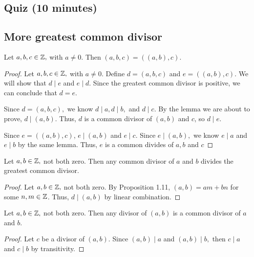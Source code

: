 \documentclass{ximera}
\begin{document}
\subsection{Quiz (10 minutes)}
\subsection{More greatest common divisor} 

\begin{lem}\label{gcd_3case}
	Let $a,b,c\in\mathbb Z,$ with $a\neq 0$. Then $(a,b,c)=((a,b),c).$
\end{lem}

 \begin{proof}
 	Let $a,b,c\in\mathbb Z,$ with $a\neq 0$. Define $d=(a,b,c)$ and $e=((a,b),c).$ We will show that $d\mid e$ and $e\mid d$. Since the greatest common divisor is positive, we can conclude that $d=e$.

 	Since $d=(a,b,c),$ we know $d\mid a, d\mid b,$ and $d\mid c$. By the lemma we are about to prove, $d\mid (a,b)$. Thus, $d$ is a common divisor of $(a,b)$ and $c$, so $d\mid e$.

 	Since $e=((a,b),c)$, $e\mid  (a,b)$ and $e\mid c$. Since $e\mid (a,b),$ we know $e\mid a$ and $e\mid b$ by the same lemma. Thus, $e$ is a common divides of $a,b$ and $c$
 \end{proof}

\begin{lem}\label{gcd_mult}
	Let $a,b\in\mathbb Z,$ not both zero. Then any  common divisor of $a$ and $b$ divides the greatest common divisor.
\end{lem}

 \begin{proof}
 	Let $a,b\in\mathbb Z,$ not both zero. By Proposition 1.11, $(a,b)=am+bn$ for some $n,m\in\mathbb Z$. Thus, $d\mid (a,b)$ by linear combination.
 \end{proof}

\begin{lem}\label{gcd_trans}
 	Let $a,b\in\mathbb Z,$ not both zero. Then any divisor of $(a,b)$ is a common divisor of $a$ and $b$.
\end{lem}

\begin{proof}
 Let $c$ be a divisor of $(a,b)$. Since $(a,b)\mid a$ and $(a,b )\mid b,$ then $c\mid a$ and $c\mid b$ by transitivity.
\end{proof}
\end{document}
